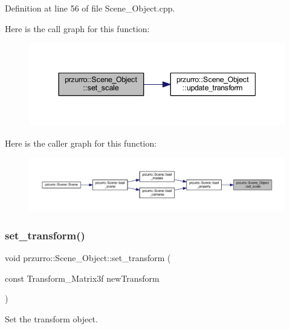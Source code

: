 Definition at line 56 of file Scene\+\_\+\+Object.\+cpp.

Here is the call graph for this function\+:
\nopagebreak
\begin{figure}[H]
\begin{center}
\leavevmode
\includegraphics[width=344pt]{d9/d84/classprzurro_1_1_scene___object_a76e1fb5b58218b916a45c04101186ac7_cgraph}
\end{center}
\end{figure}
Here is the caller graph for this function\+:
\nopagebreak
\begin{figure}[H]
\begin{center}
\leavevmode
\includegraphics[width=350pt]{d9/d84/classprzurro_1_1_scene___object_a76e1fb5b58218b916a45c04101186ac7_icgraph}
\end{center}
\end{figure}
\mbox{\label{classprzurro_1_1_scene___object_a5fddb2cb0c950b5fb5521ccd832776c3}} 
\subsubsection{\texorpdfstring{set\_transform()}{set\_transform()}}
{\footnotesize\ttfamily void przurro\+::\+Scene\+\_\+\+Object\+::set\+\_\+transform (\begin{DoxyParamCaption}\item[{const Transform\+\_\+\+Matrix3f}]{new\+Transform }\end{DoxyParamCaption})}



Set the transform object. 


